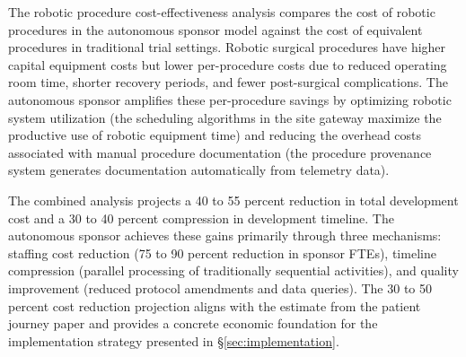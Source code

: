 The robotic procedure cost-effectiveness analysis compares the cost of robotic procedures
in the autonomous sponsor model against the cost of equivalent procedures in traditional
trial settings. Robotic surgical procedures have higher capital equipment costs but lower
per-procedure costs due to reduced operating room time, shorter recovery periods, and
fewer post-surgical complications. The autonomous sponsor amplifies these per-procedure
savings by optimizing robotic system utilization (the scheduling algorithms in the site
gateway maximize the productive use of robotic equipment time) and reducing the overhead
costs associated with manual procedure documentation (the procedure provenance system
generates documentation automatically from telemetry data).

The combined analysis projects a 40 to 55 percent reduction in total development cost
and a 30 to 40 percent compression in development timeline. The autonomous sponsor
achieves these gains primarily through three mechanisms: staffing cost reduction (75 to
90 percent reduction in sponsor FTEs), timeline compression (parallel processing of
traditionally sequential activities), and quality improvement (reduced protocol amendments
and data queries). The 30 to 50 percent cost reduction projection aligns with the
estimate from the patient journey paper \cite{patient-journey-paper} and provides a
concrete economic foundation for the implementation strategy presented in
\S\ref{sec:implementation}.
